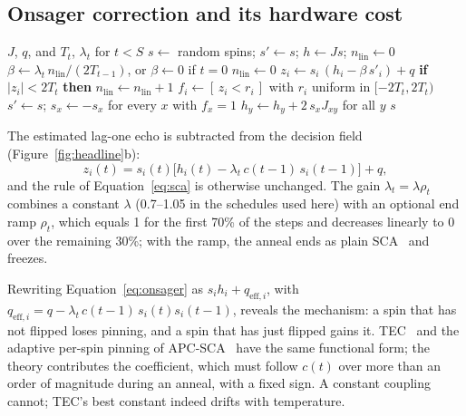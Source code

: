 \subsection{Onsager correction and its hardware cost}\label{subsec:onsager}
\begin{algorithm}[t]
\caption{One anneal of Onsager-online ($s'$: previous state). Onsager-$\kappa T$ uses $\beta\gets\kappa\,T_{t-1}\rho_t$ in line~3.}
\label{alg:anneal}
\begin{algorithmic}[1]
\Require $J$, $q$, and $T_t$, $\lambda_t$ for $t<S$
\State $s\gets$ random spins;\; $s'\gets s$;\; $h\gets Js$;\; $n_{\mathrm{lin}}\gets0$
  \State $\beta\gets\lambda_t\,n_{\mathrm{lin}}/(2T_{t-1})$, or $\beta\gets0$ if $t=0$
  \State $n_{\mathrm{lin}}\gets0$
    \State $z_i\gets s_i\,(h_i-\beta\,s'_i)+q$
    \State \textbf{if} $|z_i|<2T_t$ \textbf{then} $n_{\mathrm{lin}}\gets n_{\mathrm{lin}}+1$
    \State $f_i\gets[\,z_i<r_i\,]$ with $r_i$ uniform in $[-2T_t,2T_t)$
  \EndFor
  \State $s'\gets s$;\; $s_x\gets-s_x$ for every $x$ with $f_x=1$
   
    \State $h_y\gets h_y+2\,s_xJ_{xy}$ for all $y$
  \EndFor
\EndFor
\State \Return $s$
\end{algorithmic}
\end{algorithm}
The estimated lag-one echo is subtracted from the decision field (Figure~\ref{fig:headline}b):
\begin{equation}
  z_i(t)=s_i(t)\bigl[h_i(t)-\lambda_t\,c(t{-}1)\,s_i(t{-}1)\bigr]+q ,
  \label{eq:onsager}
\end{equation}
and the rule of Equation~\eqref{eq:sca} is otherwise unchanged. The gain $\lambda_t=\lambda\rho_t$ combines a constant $\lambda$ (0.7--1.05 in the schedules used here) with an optional end ramp $\rho_t$, which equals 1 for the first 70\% of the steps and decreases linearly to 0 over the remaining 30\%; with the ramp, the anneal ends as plain SCA~\cite{9062965} and freezes.

Rewriting Equation~\eqref{eq:onsager} as $s_ih_i+q_{\mathrm{eff},i}$, with $q_{\mathrm{eff},i}=q-\lambda_t\,c(t{-}1)\,s_i(t)s_i(t{-}1)$, reveals the mechanism: a spin that has not flipped loses pinning, and a spin that has just flipped gains it. TEC~\cite{du2026tec} and the adaptive per-spin pinning of APC-SCA~\cite{okonogi2023apc} have the same functional form; the theory contributes the coefficient, which must follow $c(t)$ over more than an order of magnitude during an anneal, with a fixed sign. A constant coupling cannot; TEC's best constant indeed drifts with temperature.

